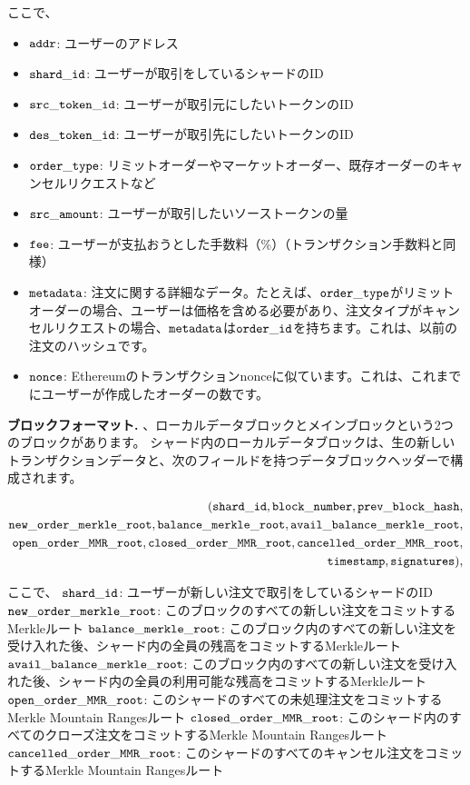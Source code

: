 ここで、
\begin{itemize}
\item ${\mathtt{addr}}$: ユーザーのアドレス
\item ${\mathtt{shard\_id}}$: ユーザーが取引をしているシャードのID
\item ${\mathtt{src\_token\_id}}$: ユーザーが取引元にしたいトークンのID
\item ${\mathtt{des\_token\_id}}$: ユーザーが取引先にしたいトークンのID
\item ${\mathtt{order\_type}}$: リミットオーダーやマーケットオーダー、既存オーダーのキャンセルリクエストなど
\item ${\mathtt{src\_amount}}$: ユーザーが取引したいソーストークンの量
\item ${\mathtt{fee}}$: ユーザーが支払おうとした手数料（\%）（トランザクション手数料と同様）
\item ${\mathtt{metadata}}$: 注文に関する詳細なデータ。たとえば、${\mathtt{order\_type}}$がリミットオーダーの場合、ユーザーは価格を含める必要があり、注文タイプがキャンセルリクエストの場合、${\mathtt{metadata}}$は${\mathtt{order\_id}}$を持ちます。これは、以前の注文のハッシュです。
\item ${\mathtt{nonce}}$: Ethereumのトランザクションnonceに似ています。これは、これまでにユーザーが作成したオーダーの数です。
\end{itemize}

\textbf{ブロックフォーマット.} 、ローカルデータブロックとメインブロックという2つのブロックがあります。 シャード内のローカルデータブロックは、生の新しいトランザクションデータと、次のフィールドを持つデータブロックヘッダーで構成されます。

\begin{align*}
({\mathtt{shard\_id}}, {\mathtt{block\_number}}, {\mathtt{prev\_block\_hash}},\\ {\mathtt{new\_order\_merkle\_root}}, {\mathtt{balance\_merkle\_root}}, {\mathtt{avail\_balance\_merkle\_root}},\\ {\mathtt{open\_order\_MMR\_root}}, {\mathtt{closed\_order\_MMR\_root}}, {\mathtt{cancelled\_order\_MMR\_root}},\\ {\mathtt{timestamp}}, {\mathtt{signatures}}),
\end{align*}

ここで、
${\mathtt{shard\_id}}$: ユーザーが新しい注文で取引をしているシャードのID 
${\mathtt{new\_order\_merkle\_root}}$: このブロックのすべての新しい注文をコミットするMerkleルート
${\mathtt{balance\_merkle\_root}}$: このブロック内のすべての新しい注文を受け入れた後、シャード内の全員の残高をコミットするMerkleルート  
${\mathtt{avail\_balance\_merkle\_root}}$: このブロック内のすべての新しい注文を受け入れた後、シャード内の全員の利用可能な残高をコミットするMerkleルート
${\mathtt{open\_order\_MMR\_root}}$: このシャードのすべての未処理注文をコミットするMerkle Mountain Rangesルート
${\mathtt{closed\_order\_MMR\_root}}$: このシャード内のすべてのクローズ注文をコミットするMerkle Mountain Rangesルート
${\mathtt{cancelled\_order\_MMR\_root}}$: このシャードのすべてのキャンセル注文をコミットするMerkle Mountain Rangesルート 

